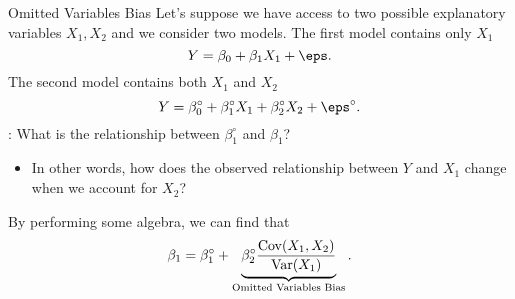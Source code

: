 \documentclass[notheorems, 9pt, handout]{beamer}
\begin{document}
\begin{frame}{Omitted Variables Bias} %
	\label{frame:omitted2} %
	Let's suppose we have access to two possible explanatory variables \(X_1,X_2\) and we consider two models. The first model contains only  \(X_1\)
	\[
	    Y = \beta_0 + \beta_1 X_1 + \eps 
	.\]
	The second model contains both \(X_1\) and  \(X_2\)
	 \[
	    Y = \beta_0^\circ + \beta_1^\circ X_1 + \beta_2^\circ X_2 + \eps^\circ
	.\] 
	\onslide<2->
	: What is the relationship between \(\beta_1^\circ\) and  \(\beta_1\)? 
	 \begin{itemize}
		 \item In other words, how does the observed relationship between \(Y\) and  \(X_1\) change when we account for \(X_2\)?
	\end{itemize}
	By performing some algebra, we can find that
	\[
		\beta_1 = \beta_1^\circ + \underbrace{\beta_2^\circ\frac{\operatorname{Cov}(X_1,X_2)}{\operatorname{Var}(X_1)}}_{\text{Omitted Variables Bias}}
	.\] 
\end{frame}
\end{document}
